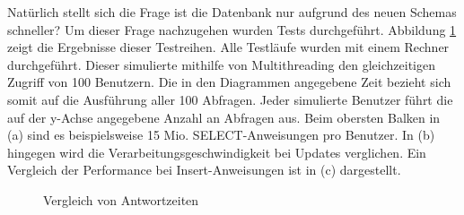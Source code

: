 Natürlich stellt sich die Frage ist die Datenbank nur aufgrund des neuen Schemas schneller? Um dieser Frage nachzugehen wurden Tests durchgeführt. Abbildung \ref{ergebniss_vergleich} zeigt die Ergebnisse dieser Testreihen. Alle Testläufe wurden mit einem Rechner durchgeführt. Dieser simulierte mithilfe von Multithreading den gleichzeitigen Zugriff von 100 Benutzern. Die in den Diagrammen angegebene Zeit bezieht sich somit auf die Ausführung aller 100 Abfragen. Jeder simulierte Benutzer führt die auf der y-Achse angegebene Anzahl an Abfragen aus. Beim obersten Balken in (a) sind es beispielsweise 15 Mio. SELECT-Anweisungen pro Benutzer. In (b) hingegen wird die Verarbeitungsgeschwindigkeit bei Updates verglichen. Ein Vergleich der Performance bei Insert-Anweisungen ist in (c) dargestellt.    

\begin{figure}[htbp]
\centering
{}\hfill
{}\hfill
{}
\caption{Vergleich von Antwortzeiten}
\label{ergebniss_vergleich}
\end{figure}

